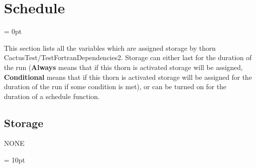 
\section{Schedule} 


\parskip = 0pt


\noindent This section lists all the variables which are assigned storage by thorn CactusTest/TestFortranDependencies2.  Storage can either last for the duration of the run ({\bf Always} means that if this thorn is activated storage will be assigned, {\bf Conditional} means that if this thorn is activated storage will be assigned for the duration of the run if some condition is met), or can be turned on for the duration of a schedule function.


\subsection*{Storage}NONE

\vspace{5mm}\parskip = 10pt 
